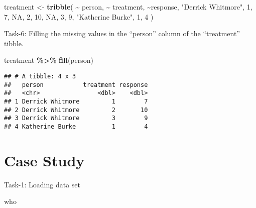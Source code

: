 \documentclass[
]{article}
\newenvironment{Shaded}{\begin{snugshade}}{\end{snugshade}}
\newcommand{\ConstantTok}[1]{\textcolor[rgb]{0.56,0.35,0.01}{#1}}
\newcommand{\DecValTok}[1]{\textcolor[rgb]{0.00,0.00,0.81}{#1}}
\newcommand{\FunctionTok}[1]{\textcolor[rgb]{0.13,0.29,0.53}{\textbf{#1}}}
\newcommand{\NormalTok}[1]{#1}
\newcommand{\OtherTok}[1]{\textcolor[rgb]{0.56,0.35,0.01}{#1}}
\newcommand{\SpecialCharTok}[1]{\textcolor[rgb]{0.81,0.36,0.00}{\textbf{#1}}}
\newcommand{\StringTok}[1]{\textcolor[rgb]{0.31,0.60,0.02}{#1}}
\begin{document}
\begin{Shaded}
\begin{Highlighting}[]
\NormalTok{treatment }\OtherTok{\textless{}{-}} \FunctionTok{tribble}\NormalTok{(}
  \SpecialCharTok{\textasciitilde{}}\NormalTok{ person,           }\SpecialCharTok{\textasciitilde{}}\NormalTok{ treatment, }\SpecialCharTok{\textasciitilde{}}\NormalTok{response,}
  \StringTok{"Derrick Whitmore"}\NormalTok{, }\DecValTok{1}\NormalTok{,           }\DecValTok{7}\NormalTok{,}
  \ConstantTok{NA}\NormalTok{,                 }\DecValTok{2}\NormalTok{,           }\DecValTok{10}\NormalTok{,}
  \ConstantTok{NA}\NormalTok{,                 }\DecValTok{3}\NormalTok{,           }\DecValTok{9}\NormalTok{,}
  \StringTok{"Katherine Burke"}\NormalTok{,  }\DecValTok{1}\NormalTok{,           }\DecValTok{4}
\NormalTok{)}
\end{Highlighting}
\end{Shaded}

Task-6: Filling the missing values in the ``person'' column of the
``treatment'' tibble.

\begin{Shaded}
\begin{Highlighting}[]
\NormalTok{treatment }\SpecialCharTok{\%\textgreater{}\%} 
  \FunctionTok{fill}\NormalTok{(person)}
\end{Highlighting}
\end{Shaded}

\begin{verbatim}
## # A tibble: 4 x 3
##   person           treatment response
##   <chr>                <dbl>    <dbl>
## 1 Derrick Whitmore         1        7
## 2 Derrick Whitmore         2       10
## 3 Derrick Whitmore         3        9
## 4 Katherine Burke          1        4
\end{verbatim}

\hypertarget{case-study}{%
\section{Case Study}\label{case-study}}

Task-1: Loading data set

\begin{Shaded}
\begin{Highlighting}[]
\NormalTok{who}
\end{Highlighting}
\end{Shaded}
\end{document}
